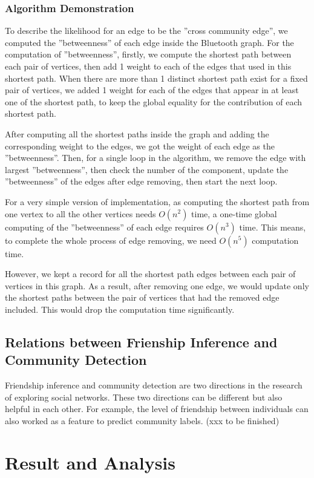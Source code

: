 \documentclass[11pt]{article}
\begin{document}
\subsubsection{Algorithm Demonstration} 
To describe the likelihood for an edge to be the ''cross community edge'', we computed the ''betweenness'' of each edge inside the Bluetooth graph. For the computation of ''betweenness'', firstly, we compute the shortest path between each pair of vertices, then add 1 weight to each of the edges that used in this shortest path. When there are more than 1 distinct shortest path exist for a fixed pair of vertices, we added 1 weight for each of the edges that appear in at least one of the shortest path, to keep the global equality for the contribution of each shortest path.

After computing all the shortest paths inside the graph and adding the corresponding weight to the edges, we got the weight of each edge as the ''betweenness''. Then, for a single loop in the algorithm, we remove the edge with largest ''betweenness'', then check the number of the component, update the ''betweenness'' of the edges after edge removing, then start the next loop.

For a very simple version of implementation, as computing the shortest path from one vertex to all the other vertices needs \(O(n^2)\) time, a one-time global computing of the ''betweenness'' of each edge requires \(O(n^3)\) time. This means, to complete the whole process of edge removing, we need \(O(n^5)\) computation time.

However, we kept a record for all the shortest path edges between each pair of vertices in this graph. As a result, after removing one edge, we would update only the shortest paths between the pair of vertices that had the removed edge included. This would drop the computation time significantly.  

\subsection{Relations between Frienship Inference and Community Detection}
Friendship inference and community detection are two directions in the research of exploring social networks. These two directions can be different but also helpful in each other. For example, the level of friendship between individuals can also worked as a feature to predict community labels. (xxx to be finished)

\section{Result and Analysis} \label{result}
\end{document}
